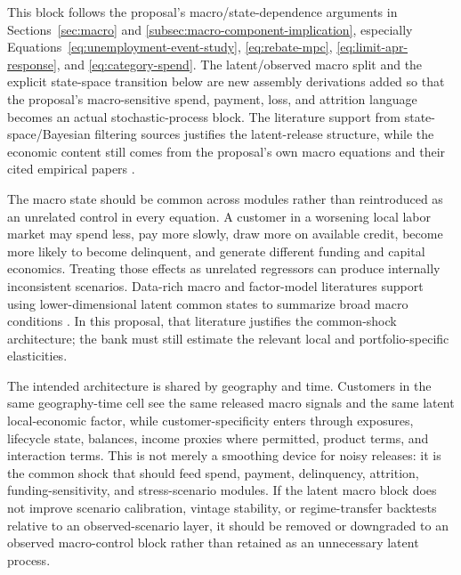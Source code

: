 \documentclass[11pt]{article}
\newcommand{\1}{\mathbf{1}}
\begin{document}
This block follows the proposal's macro/state-dependence arguments in
Sections~\ref{sec:macro} and \ref{subsec:macro-component-implication},
especially Equations~\eqref{eq:unemployment-event-study},
\eqref{eq:rebate-mpc}, \eqref{eq:limit-apr-response}, and
\eqref{eq:category-spend}. The latent/observed macro split and the explicit
state-space transition below are new assembly derivations added so that the
proposal's macro-sensitive spend, payment, loss, and attrition language becomes
an actual stochastic-process block. The literature support from
state-space/Bayesian filtering sources justifies the latent-release structure,
while the economic content still comes from the proposal's own macro equations
and their cited empirical papers
\citep{durbinkoopman2012ssm,westharrison1997bfdm,
ganong2019unemployment,johnson2004rebates,gross2001liquidity,baker2020epidemic}.

The macro state should be common across modules rather than reintroduced as an
unrelated control in every equation. A customer in a worsening local labor
market may spend less, pay more slowly, draw more on available credit, become
more likely to become delinquent, and generate different funding and capital
economics.
Treating those effects as unrelated regressors can produce internally
inconsistent scenarios. Data-rich macro and factor-model literatures support
using lower-dimensional latent common states to summarize broad macro
conditions \citep{bernankeboivin2003datarich,bernankeboivineliasz2005favar,
stockwatson2005factorvar}. In this proposal, that literature justifies the
common-shock architecture; the bank must still estimate the relevant local and
portfolio-specific elasticities.

The intended architecture is shared by geography and time. Customers in the
same geography-time cell see the same released macro signals and the same
latent local-economic factor, while customer-specificity enters through
exposures, lifecycle state, balances, income proxies where permitted, product
terms, and interaction terms. This is not merely a smoothing device for noisy
releases: it is the common shock that should feed spend, payment, delinquency,
attrition, funding-sensitivity, and stress-scenario modules. If the latent
macro block does not improve scenario calibration, vintage stability, or
regime-transfer backtests relative to an observed-scenario layer, it should be
removed or downgraded to an observed macro-control block rather than retained
as an unnecessary latent process.
\end{document}
